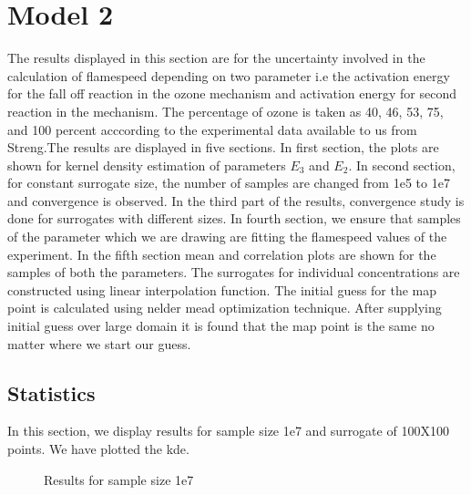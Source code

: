 \section{Model 2}

The results displayed in this section are for the uncertainty involved in the calculation of flamespeed depending  on two parameter i.e the activation energy for the fall off reaction in the ozone mechanism and activation energy for second reaction in the mechanism. The percentage of ozone is taken as 40, 46, 53, 75, and 100  percent acccording to the experimental data available to us from Streng\cite{Streng}.The results are displayed in five sections. In first section, the plots are shown for kernel density estimation of parameters $E_3$ and $E_2$. In second section, for constant surrogate size, the number of samples are changed from 1e5 to 1e7 and convergence is observed. In the third part of the results, convergence study is done for surrogates with different sizes. In fourth section, we ensure that samples of the parameter which we are drawing are fitting the flamespeed values of the experiment. In the fifth section mean and correlation plots are shown for the samples of both the parameters. The surrogates for individual concentrations are constructed using linear interpolation function. The initial guess for the map point is calculated using nelder mead optimization technique. After supplying initial guess over large domain it is found that the map point is the same no matter where we start our guess.


\subsection{ Statistics }

 In this section, we display results for sample size 1e7 and surrogate of 100X100 points. We  have plotted the kde.

\begin{figure}[H]
\centering
{}
    \caption{Results for sample size 1e7}
\end{figure}

